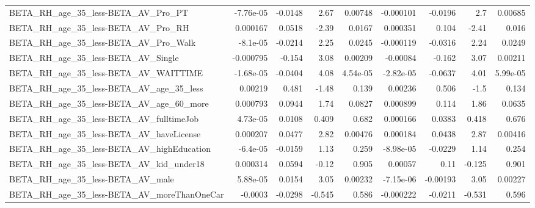 \begin{tabular}{lrrrrrrrr}
BETA\_RH\_age\_35\_less-BETA\_AV\_Pro\_PT                 &   -7.76e-05 &      -0.0148 &      2.67 &  0.00748 &  -0.000101 &     -0.0196 &          2.7 &       0.00685 \\
BETA\_RH\_age\_35\_less-BETA\_AV\_Pro\_RH                 &    0.000167 &       0.0518 &     -2.39 &   0.0167 &   0.000351 &       0.104 &        -2.41 &         0.016 \\
BETA\_RH\_age\_35\_less-BETA\_AV\_Pro\_Walk               &    -8.1e-05 &      -0.0214 &      2.25 &   0.0245 &  -0.000119 &     -0.0316 &         2.24 &        0.0249 \\
BETA\_RH\_age\_35\_less-BETA\_AV\_Single                 &   -0.000795 &       -0.154 &      3.08 &  0.00209 &   -0.00084 &      -0.162 &         3.07 &       0.00211 \\
BETA\_RH\_age\_35\_less-BETA\_AV\_WAITTIME               &   -1.68e-05 &      -0.0404 &      4.08 & 4.54e-05 &  -2.82e-05 &     -0.0637 &         4.01 &      5.99e-05 \\
BETA\_RH\_age\_35\_less-BETA\_AV\_age\_35\_less            &     0.00219 &        0.481 &     -1.48 &    0.139 &    0.00236 &       0.506 &         -1.5 &         0.134 \\
BETA\_RH\_age\_35\_less-BETA\_AV\_age\_60\_more            &    0.000793 &       0.0944 &      1.74 &   0.0827 &   0.000899 &       0.114 &         1.86 &        0.0635 \\
BETA\_RH\_age\_35\_less-BETA\_AV\_fulltimeJob            &    4.73e-05 &       0.0108 &     0.409 &    0.682 &   0.000166 &      0.0383 &        0.418 &         0.676 \\
BETA\_RH\_age\_35\_less-BETA\_AV\_haveLicense            &    0.000207 &       0.0477 &      2.82 &  0.00476 &   0.000184 &      0.0438 &         2.87 &       0.00416 \\
BETA\_RH\_age\_35\_less-BETA\_AV\_highEducation          &    -6.4e-05 &      -0.0159 &      1.13 &    0.259 &  -8.98e-05 &     -0.0229 &         1.14 &         0.254 \\
BETA\_RH\_age\_35\_less-BETA\_AV\_kid\_under18            &    0.000314 &       0.0594 &     -0.12 &    0.905 &    0.00057 &        0.11 &       -0.125 &         0.901 \\
BETA\_RH\_age\_35\_less-BETA\_AV\_male                   &    5.88e-05 &       0.0154 &      3.05 &  0.00232 &  -7.15e-06 &    -0.00193 &         3.05 &       0.00227 \\
BETA\_RH\_age\_35\_less-BETA\_AV\_moreThanOneCar         &     -0.0003 &      -0.0298 &    -0.545 &    0.586 &  -0.000222 &     -0.0211 &       -0.531 &         0.596 \\

\end{tabular}
